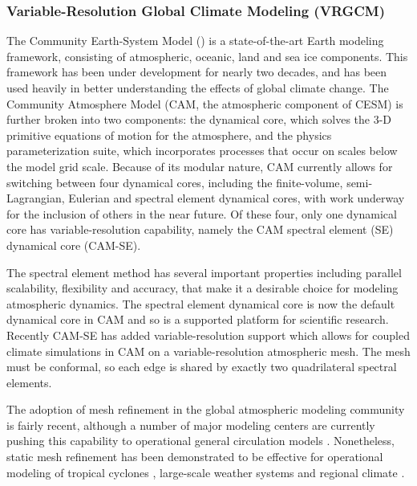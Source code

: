 \documentclass[11pt]{article}
\begin{document}
\subsubsection{Variable-Resolution Global Climate Modeling (VRGCM)}

The Community Earth-System Model (\citet{hurrell2013community}) is a state-of-the-art Earth modeling framework, consisting of atmospheric, oceanic, land and sea ice components. This framework has been under development for nearly two decades, and has been used heavily in better understanding the effects of global climate change. The Community Atmosphere Model (CAM, the atmospheric component of CESM) is further broken into two components: the dynamical core, which solves the 3-D primitive equations of motion for the atmosphere, and the physics parameterization suite, which incorporates processes that occur on scales below the model grid scale. Because of its modular nature, CAM currently allows for switching between four dynamical cores, including the finite-volume, semi-Lagrangian, Eulerian and spectral element dynamical cores, with work underway for the inclusion of others in the near future. Of these four, only one dynamical core has variable-resolution capability, namely the CAM spectral element (SE) dynamical core (CAM-SE).

The spectral element method has several important properties including parallel scalability, flexibility and accuracy, that make it a desirable choice for modeling atmospheric dynamics.  The spectral element dynamical core \citet{fournier2004spectral, taylor2010compatible} is now the default dynamical core in CAM and so is a supported platform for scientific research. Recently CAM-SE has added variable-resolution support which allows for coupled climate simulations in CAM on a variable-resolution atmospheric mesh. The mesh must be conformal, so each edge is shared by exactly two quadrilateral spectral elements. 

The adoption of mesh refinement in the global atmospheric modeling community is fairly recent, although a number of major modeling centers are currently pushing this capability to operational general circulation models \cite{skamarock2012mpas, LMHSJL2013MWR, CMZCJMAT2013MWR, mccorquodale2014adaptive}.   Nonetheless, static mesh refinement has been demonstrated to be effective for operational modeling of tropical cyclones \cite{zarzycki2014multidecadal, zarzycki2014using}, large-scale weather systems \cite{rauscher2014impact} and regional climate \cite{rauscher2013exploring, zarzycki2014aquaplanet}.
\end{document}
